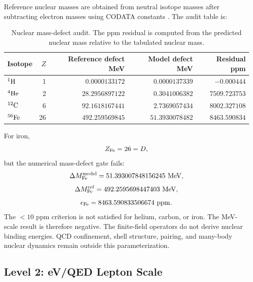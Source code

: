 \documentclass[11pt]{article}
\begin{document}
Reference nuclear masses are obtained from neutral isotope masses after
subtracting electron masses using CODATA constants
\cite{nistatomicweights,codata2018}.  The audit table is:
\begin{table}[h]
\centering
\caption{Nuclear mass-defect audit.  The ppm residual is computed from the
predicted nuclear mass relative to the tabulated nuclear mass.}
\begin{tabular}{lrrrr}
\toprule
Isotope & $Z$ & Reference defect MeV & Model defect MeV & Residual ppm \\
\midrule
$^1{\rm H}$     & 1  & $0.0000133172$ & $0.0000137339$ & $-0.000444$ \\
$^4{\rm He}$    & 2  & $28.2956897122$ & $0.3041006382$ & $7509.723753$ \\
$^{12}{\rm C}$  & 6  & $92.1618167441$ & $2.7369057434$ & $8002.327108$ \\
$^{56}{\rm Fe}$ & 26 & $492.259569845$ & $51.3930078482$ & $8463.590834$ \\
\bottomrule
\end{tabular}
\end{table}

For iron,
\begin{equation}
    Z_{\rm Fe}=26=D,
\end{equation}
but the numerical mass-defect gate fails:
\begin{equation}
    \Delta M_{\rm Fe}^{\rm model}=51.393007848156245~{\rm MeV},
\end{equation}
\begin{equation}
    \Delta M_{\rm Fe}^{\rm ref}=492.2595698447403~{\rm MeV},
\end{equation}
\begin{equation}
    \epsilon_{\rm Fe}=8463.590833506674~{\rm ppm}.
\end{equation}
The $<10$ ppm criterion is not satisfied for helium, carbon, or iron.  The
MeV-scale result is therefore negative.  The finite-field operators do not
derive nuclear binding energies.  QCD confinement, shell structure, pairing,
and many-body nuclear dynamics remain outside this parameterization.

\subsection{Level 2: eV/QED Lepton Scale}
\end{document}
